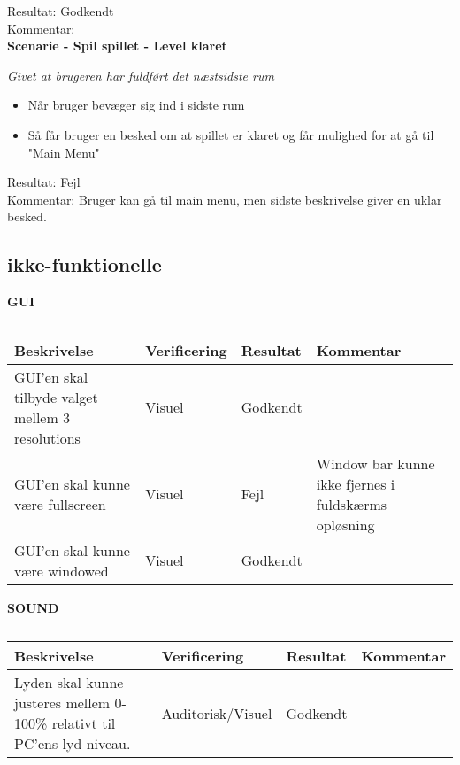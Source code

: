 Resultat: Godkendt\\
Kommentar:\\

\bf{Scenarie - Spil spillet - Level klaret}

\it{Givet at brugeren har fuldført det næstsidste rum}

\begin{itemize}
  \item Når bruger bevæger sig ind i sidste rum
  \item Så får bruger en besked om at spillet er klaret og får mulighed for at gå til "Main Menu"
\end{itemize}

Resultat: Fejl\\
Kommentar: Bruger kan gå til main menu, men sidste beskrivelse giver en uklar besked.\\

\subsection{ikke-funktionelle}
\bf{GUI}
\begin{table}[H]
\caption{}
\label{tab:}
\begin{tabular}{p{3cm}|p{3cm}|p{3cm}|p{3cm}}
Beskrivelse & Verificering & Resultat & Kommentar \\
\hline
GUI'en skal tilbyde valget mellem 3 resolutions & Visuel & Godkendt & \\
\hline
GUI'en skal kunne være fullscreen & Visuel & Fejl & Window bar kunne ikke fjernes i fuldskærms opløsning\\
\hline
GUI'en skal kunne være windowed & Visuel & Godkendt & \\
\end{tabular}
\end{table}

\bf{SOUND}
\begin{table}[H]
\caption{}
\label{tab:}
\begin{tabular}{p{3cm}|p{3cm}|p{3cm}|p{3cm}}
Beskrivelse & Verificering & Resultat & Kommentar \\
\hline
Lyden skal kunne justeres mellem 0-100\% relativt til PC'ens lyd niveau. & Auditorisk/Visuel & Godkendt & \\
\hline
\end{tabular}
\end{table}

